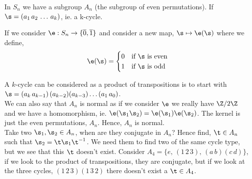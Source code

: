 In $S_n$ we have a subgroup $A_n$ (the subgroup of even permutations). If $\s = (a_1\,a_2\,\dots\,a_k)$, ie. a k-cycle.
\begin{ndefi}[Signature]
  If we consider $\e : S_n \to \{\overline{0}, \overline{1}\}$ and consider a new map, $\s \mapsto \e(\s)$ where we define,
  $$ \e(\s) = \begin{cases}
    0 & \text{if $\s$ is even}\\
    1 & \text{if $\s$ is odd}
  \end{cases} $$
\end{ndefi}

A $k$-cycle can be considered as a product of transpositions is to start with $\s = (a_k\, a_{k-1})\,(a_{k-2})(a_{k-3})\dots (a_1\,a_0)$.\\
We can also say that $A_n$ is normal as if we consider $\e$ we really have $\Z/2\Z$ and we have a homomorphism, ie. $\e(\s_1\s_2) = \e(\s_1)\e(\s_2)$. The kernel is just the even permutations, $A_n$. Hence, $A_n$ is normal.\\

Take two $\s_1, \s_2 \in A_n$, when are they conjugate in $A_n$? Hence find, $\t \in A_n$ such that $\s_2 = \t\s_1\t^{-1}$. We need them to find two of the same cycle type, but we see that this $\t$ doesn't exist. Consider $A_4 = \{e,\,(1\,2\,3),\, (a\,b)(c\,d)\}$, if we look to the product of transpositions, they are conjugate, but if we look at the three cycles, $(1\,2\,3)(1\,3\,2)$ there doesn't exist a $\t \in A_4$.
